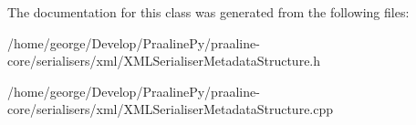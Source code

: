 The documentation for this class was generated from the following files\+:\begin{DoxyCompactItemize}
\item 
/home/george/\+Develop/\+Praaline\+Py/praaline-\/core/serialisers/xml/X\+M\+L\+Serialiser\+Metadata\+Structure.\+h\item 
/home/george/\+Develop/\+Praaline\+Py/praaline-\/core/serialisers/xml/X\+M\+L\+Serialiser\+Metadata\+Structure.\+cpp\end{DoxyCompactItemize}
